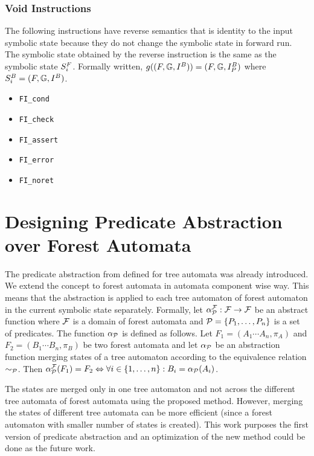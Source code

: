 \subsubsection{Void Instructions}
The following instructions have reverse semantics that is identity
to the input symbolic state 
because they do not change the symbolic state in forward run.
The symbolic state obtained by the reverse instruction
is the same as the symbolic state $S^{F}_{i}$.
Formally written, $g((F, \mathbb{G}, I^{B})) = 
			(F, \mathbb{G}, I^{B}_{P})$
			where $S^{B}_{i} = (F, \mathbb{G}, I^{B})$.

\begin{itemize}
	
	\item {\tt FI\_cond}
	
	\item {\tt FI\_check}
	
	\item {\tt FI\_assert}
	
	\item {\tt FI\_error}
	
	\item {\tt FI\_noret}

\end{itemize}


\section{Designing Predicate Abstraction over Forest Automata}
\label{sec:padesign}

The predicate abstraction from \cite{artmc} defined for tree automata
was already introduced.
We extend the concept to forest automata in automata component wise way.
This means that the abstraction is applied to each tree automaton of
forest automaton in the current symbolic state separately.
Formally, let $\alpha_{\mathcal{P}}^{\mathcal{F}}: \mathcal{F} \rightarrow \mathcal{F}$ be an abstract function where
$\mathcal{F}$ is a domain of forest automata and $\mathcal{P} = \{P_1, \ldots, P_n\}$ is a set of predicates.
The function $\alpha_{\mathcal{P}}$ is defined as follows.
Let $F_1=(A_1 \cdots A_n, \pi_A)$ and $F_2=(B_1 \cdots B_n, \pi_B)$ be two forest automata
and let $\alpha_{\mathcal{P}}$ be an abstraction function merging states of a tree automaton according
to the equivalence relation $\sim_{\mathcal{P}}$.
Then $\alpha_{\mathcal{P}}^{\mathcal{F}}(F_1) = F_2 \Leftrightarrow \forall i \in \{1,\ldots,n\}: B_i = \alpha_{\mathcal{P}}(A_i)$.

The states are merged only in one tree automaton and not across the different
tree automata of forest automata using the proposed method.
However, merging the states of different tree automata can be more efficient (since
a forest automaton with smaller number of states is created).
This work purposes the first version of predicate abstraction and 
an optimization of the new method could be done as the future work.

